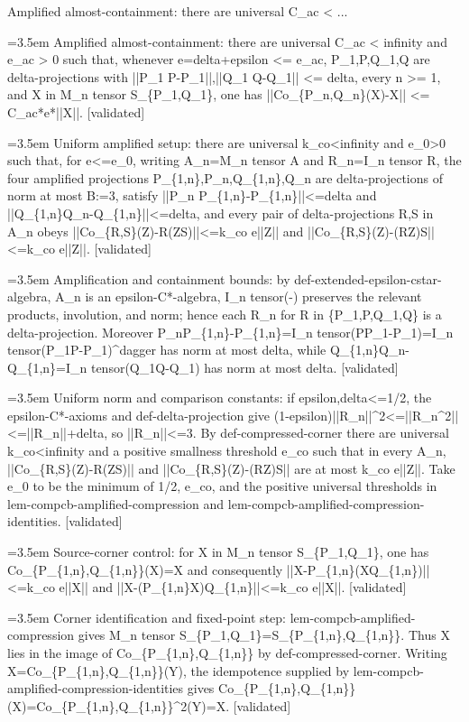 \documentclass{article}
\newcommand{\step}[1]{\par\noindent\hangindent=3.5em\hangafter=1%
  \makebox[3.5em][l]{\textbf{#1.}}}
\newcommand{\steptag}[1]{\hfill{\small\textsf{[#1]}}}
\begin{document}
\begin{proofbox}{Amplified almost-containment: there are universal C\_ac < ...}
\step{1} Amplified almost-containment: there are universal C\_ac < infinity and e\_ac > 0 such that, whenever e=delta+epsilon <= e\_ac, P\_1,P,Q\_1,Q are delta-projections with ||P\_1 P-P\_1||,||Q\_1 Q-Q\_1|| <= delta, every n >= 1, and X in M\_n tensor S\_\{P\_1,Q\_1\}, one has ||Co\_\{P\_n,Q\_n\}(X)-X|| <= C\_ac*e*||X||. \steptag{validated} \\[6pt]
\step{1.1} Uniform amplified setup: there are universal k\_co<infinity and e\_0>0 such that, for e<=e\_0, writing A\_n=M\_n tensor A and R\_n=I\_n tensor R, the four amplified projections P\_\{1,n\},P\_n,Q\_\{1,n\},Q\_n are delta-projections of norm at most B:=3, satisfy ||P\_n P\_\{1,n\}-P\_\{1,n\}||<=delta and ||Q\_\{1,n\}Q\_n-Q\_\{1,n\}||<=delta, and every pair of delta-projections R,S in A\_n obeys ||Co\_\{R,S\}(Z)-R(ZS)||<=k\_co e||Z|| and ||Co\_\{R,S\}(Z)-(RZ)S||<=k\_co e||Z||. \steptag{validated} \\[6pt]
\step{1.1.1} Amplification and containment bounds: by def-extended-epsilon-cstar-algebra, A\_n is an epsilon-C*-algebra, I\_n tensor(-) preserves the relevant products, involution, and norm; hence each R\_n for R in \{P\_1,P,Q\_1,Q\} is a delta-projection. Moreover P\_nP\_\{1,n\}-P\_\{1,n\}=I\_n tensor(PP\_1-P\_1)=I\_n tensor(P\_1P-P\_1)\textasciicircum{}dagger has norm at most delta, while Q\_\{1,n\}Q\_n-Q\_\{1,n\}=I\_n tensor(Q\_1Q-Q\_1) has norm at most delta. \steptag{validated} \\[4pt]
\step{1.1.2} Uniform norm and comparison constants: if epsilon,delta<=1/2, the epsilon-C*-axioms and def-delta-projection give (1-epsilon)||R\_n||\textasciicircum{}2<=||R\_n\textasciicircum{}2||<=||R\_n||+delta, so ||R\_n||<=3. By def-compressed-corner there are universal k\_co<infinity and a positive smallness threshold e\_co such that in every A\_n, ||Co\_\{R,S\}(Z)-R(ZS)|| and ||Co\_\{R,S\}(Z)-(RZ)S|| are at most k\_co e||Z||. Take e\_0 to be the minimum of 1/2, e\_co, and the positive universal thresholds in lem-compcb-amplified-compression and lem-compcb-amplified-compression-identities. \steptag{validated} \\[4pt]
\step{1.2} Source-corner control: for X in M\_n tensor S\_\{P\_1,Q\_1\}, one has Co\_\{P\_\{1,n\},Q\_\{1,n\}\}(X)=X and consequently ||X-P\_\{1,n\}(XQ\_\{1,n\})||<=k\_co e||X|| and ||X-(P\_\{1,n\}X)Q\_\{1,n\}||<=k\_co e||X||. \steptag{validated} \\[6pt]
\step{1.2.1} Corner identification and fixed-point step: lem-compcb-amplified-compression gives M\_n tensor S\_\{P\_1,Q\_1\}=S\_\{P\_\{1,n\},Q\_\{1,n\}\}. Thus X lies in the image of Co\_\{P\_\{1,n\},Q\_\{1,n\}\} by def-compressed-corner. Writing X=Co\_\{P\_\{1,n\},Q\_\{1,n\}\}(Y), the idempotence supplied by lem-compcb-amplified-compression-identities gives Co\_\{P\_\{1,n\},Q\_\{1,n\}\}(X)=Co\_\{P\_\{1,n\},Q\_\{1,n\}\}\textasciicircum{}2(Y)=X. \steptag{validated} \\[4pt]

\end{proofbox}
\end{document}
